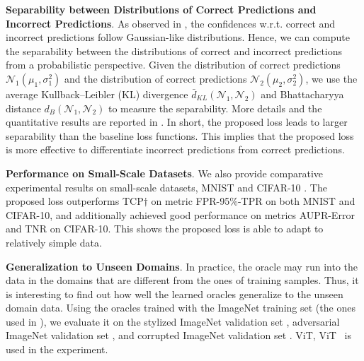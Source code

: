\noindent\textbf{Separability between Distributions of Correct Predictions and Incorrect Predictions}.
As observed in , the confidences w.r.t. correct and incorrect predictions follow Gaussian-like distributions.
Hence, we can compute the separability between the distributions of correct and incorrect predictions from a probabilistic perspective.
Given the distribution of correct predictions {\small $\mathcal{N}_{1}(\mu_{1}, \sigma^{2}_{1})$} and the distribution of correct predictions {\small $\mathcal{N}_{2}(\mu_{2}, \sigma^{2}_{2})$}, we use the average Kullback–Leibler (KL) divergence {\small $\bar{d}_{KL}(\mathcal{N}_{1}, \mathcal{N}_{2})$} \cite{Kullback_AMS_1951} and Bhattacharyya distance {\small $d_{B}(\mathcal{N}_{1}, \mathcal{N}_{2})$} \cite{Bhattacharyya_JSTOR_1946} to measure the separability. 
More details and the quantitative results are reported in . 
In short, the proposed loss leads to larger separability than the baseline loss functions. 
This implies that the proposed loss is more effective to differentiate incorrect predictions from correct predictions.

\noindent\textbf{Performance on Small-Scale Datasets}.
We also provide comparative experimental results on small-scale datasets, \ie MNIST \cite{Lecun_IEEE_1998} and CIFAR-10 \cite{Krizhevsky_TR_2009}.
The proposed loss outperforms TCP$\dagger$ on metric FPR-95\%-TPR on both MNIST and CIFAR-10, and additionally achieved good performance on metrics AUPR-Error and TNR on CIFAR-10.
This shows the proposed loss is able to adapt to relatively simple data.

\noindent\textbf{Generalization to Unseen Domains}.
In practice, the oracle may run into the data in the domains that are different from the ones of training samples.
Thus, it is interesting to find out how well the learned oracles generalize to the unseen domain data.
Using the oracles trained with the ImageNet training set (\ie the ones used in ), we evaluate it on the stylized ImageNet validation set \cite{Geirhos_ICLR_2019}, adversarial ImageNet validation set \cite{Laidlaw_NeurIPS_2019}, and corrupted ImageNet validation set \cite{Hendrycks_ICLR_2018}.
\textlangle ViT, ViT\textrangle~ is used in the experiment.

